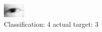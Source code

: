 \begin{figure}[h!]
\begin{center}
\includegraphics[width=0.60\columnwidth]{figures/ID167_class_4_target_3.png}
\end{center}
\caption{ Classification: 4 actual target: 3}
\label{fig:ID167_class_4_target_3}
\end{figure}
